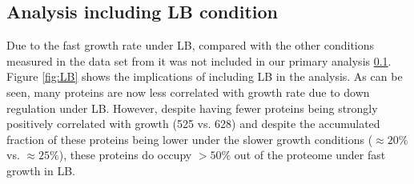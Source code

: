\subsection{Analysis including LB condition}
Due to the fast growth rate under LB, compared with the other conditions measured in the data set from \cite{Heinemann2015} it was not included in our primary analysis \ref{}.
Figure \ref{fig:LB} shows the implications of including LB in the analysis.
As can be seen, many proteins are now less correlated with growth rate due to down regulation under LB.
However, despite having fewer proteins being strongly positively correlated with growth (525 vs. 628) and despite the accumulated fraction of these proteins being lower under the slower growth conditions ($\approx20\%$ vs. $\approx25\%$), these proteins do occupy $>50\%$ out of the proteome under fast growth in LB.
